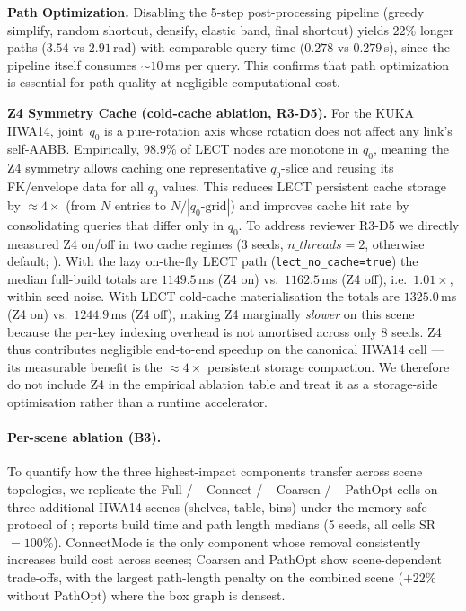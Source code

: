 \documentclass[journal]{IEEEtran}
\begin{document}
\textbf{Path Optimization.}
Disabling the 5-step post-processing pipeline (greedy simplify, random
shortcut, densify, elastic band, final shortcut) yields $22\%$ longer paths
($3.54$ vs $2.91$\,rad) with comparable query time ($0.278$ vs $0.279$\,s),
since the pipeline itself consumes $\sim$$10$\,ms per query.
This confirms that path optimization is essential for path quality at
negligible computational cost.

\textbf{Z4 Symmetry Cache (cold-cache ablation, R3-D5).}
For the KUKA IIWA14, joint~$q_0$ is a pure-rotation axis whose rotation
does not affect any link's self-AABB.
Empirically, $98.9\%$ of LECT nodes are monotone in $q_0$, meaning the
Z4 symmetry allows caching one representative $q_0$-slice and reusing its
FK/envelope data for all $q_0$ values.
This reduces LECT persistent cache storage by ${\approx}4{\times}$
(from $N$ entries to $N/|q_0\text{-grid}|$) and improves cache hit rate
by consolidating queries that differ only in $q_0$.
To address reviewer R3-D5 we directly measured Z4 on/off in two cache
regimes (3 seeds, $n\_threads=2$, otherwise default;
). With the lazy on-the-fly LECT path
(\texttt{lect\_no\_cache=true}) the median full-build totals are
$1149.5$\,ms (Z4 on) vs.\ $1162.5$\,ms (Z4 off), i.e.\ $1.01\times$,
within seed noise. With LECT cold-cache materialisation the totals are
$1325.0$\,ms (Z4 on) vs.\ $1244.9$\,ms (Z4 off), making Z4 marginally
\emph{slower} on this scene because the per-key indexing overhead is
not amortised across only 8 seeds. Z4 thus contributes negligible
end-to-end speedup on the canonical IIWA14 cell --- its measurable
benefit is the $\approx 4\times$ persistent storage compaction. We
therefore do not include Z4 in the empirical ablation table and treat
it as a storage-side optimisation rather than a runtime accelerator.


\paragraph{Per-scene ablation (B3).}
To quantify how the three highest-impact components transfer across
scene topologies, we replicate the Full / $-$Connect / $-$Coarsen /
$-$PathOpt cells on three additional IIWA14 scenes (shelves, table,
bins) under the memory-safe protocol of
;  reports build
time and path length medians (5 seeds, all cells SR$=100\%$).
ConnectMode is the only component whose removal consistently
increases build cost across scenes; Coarsen and PathOpt show
scene-dependent trade-offs, with the largest path-length penalty
on the combined scene ($+22\%$ without PathOpt) where the box
graph is densest.

\end{document}
